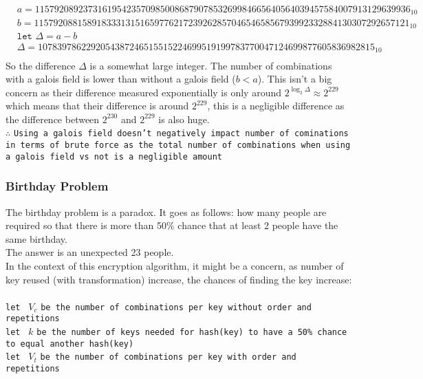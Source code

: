 \documentclass[fleqn, a4paper,12pt]{article}
\begin{document}
\[
\begin{aligned}
&a = 115792089237316195423570985008687907853269984665640564039457584007913129639936_{10} \\
&b = 115792088158918333131516597762172392628570465465856793992332884130307292657121_{10} \\
&\texttt{let  } \Delta = a-b \\
&\Delta = 1078397862292054387246515515224699519199783770047124699877605836982815_{10} \\
\end{aligned}
\]
So the difference $\Delta$ is a somewhat large integer. The number of combinations with a galois field is lower than without a galois field ($b < a$). This isn't a big concern as their difference measured exponentially is only around $2^{\log_2\Delta} \approx 2^{229}$ which means that their difference is around $2^{229}$, this is a negligible difference as the difference between $2^{230}$ and $2^{229}$ is also huge. \\
$\therefore $ \texttt{Using a galois field doesn't negatively impact number of cominations in terms of brute force as the total number of combinations when using a galois field vs not is a negligible amount}

\subsubsection {Birthday Problem}


The birthday problem is a paradox. It goes as follows: how many people are required so that there is more than 50\% chance that at least 2 people have the same birthday.
\\
The answer is an unexpected 23 people.
\\
In the context of this encryption algorithm, it might be a concern, as number of key reused (with transformation) increase, the chances of finding the key increase:
\\
\\

\texttt{let } $V_c$ \texttt{be the number of combinations per key without order and repetitions} \\
\texttt{let } $k$ \texttt{be the number of keys needed for hash(key) to have a 50\% chance to equal another hash(key)} \\
\texttt{let } $V_t$ \texttt{be the number of combinations per key with order and repetitions} \\
\end{document}

